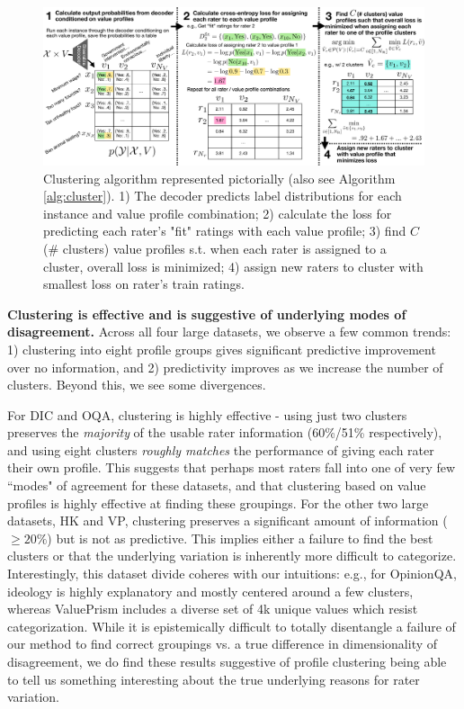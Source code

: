 \documentclass[11pt]{article}
\begin{document}
\begin{figure}[ht]
\centering
\vspace{-5pt}
\includegraphics[width=1\columnwidth]{files/clusterfig.pdf}
\small
\vspace{-15pt}
\caption{Clustering algorithm represented pictorially (also see Algorithm \ref{alg:cluster}).
1) The decoder predicts label distributions for each instance and value profile combination;
2) calculate the loss for predicting each rater's "fit" ratings with each value profile;
3) find $C$ (\# clusters) value profiles s.t. when each rater is assigned to a cluster, overall loss is minimized;
4) assign new raters to cluster with smallest loss on rater's train ratings.
}
\label{fig:clusteralgo}
\end{figure}

\textbf{Clustering is effective and is suggestive of underlying modes of disagreement.}
Across all four large datasets, we observe a few common trends: 1) clustering into eight profile groups gives significant predictive improvement over no information, and 2) predictivity improves as we increase the number of clusters. Beyond this, we see some divergences.

For DIC and OQA, clustering is highly effective - using just two clusters preserves the \textit{majority} of the usable rater information (60\%/51\% respectively), and using eight clusters \textit{roughly matches} the performance of giving each rater their own profile. This suggests that perhaps most raters fall into one of very few ``modes" of agreement for these datasets, and that clustering based on value profiles is highly effective at finding these groupings.
For the other two large datasets, HK and VP, clustering preserves a significant amount of information ($\geq20\%$) but is not as predictive.
This implies either a failure to find the best clusters or that the underlying variation is inherently more difficult to categorize. Interestingly, this dataset divide coheres with our intuitions: e.g., for OpinionQA, ideology is highly explanatory and mostly centered around a few clusters, whereas ValuePrism includes a diverse set of 4k unique values which resist categorization. While it is epistemically difficult to totally disentangle a failure of our method to find correct groupings vs. a true difference in dimensionality of disagreement, we do find these results suggestive of profile clustering being able to tell us something interesting about the true underlying reasons for rater variation.
\end{document}
